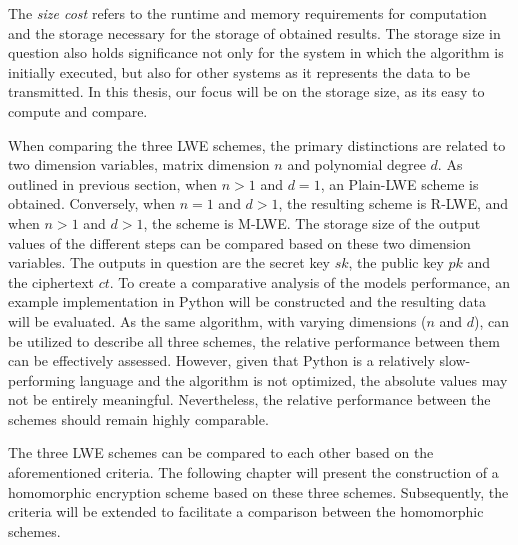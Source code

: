 The \textit{size cost} refers to the runtime and memory requirements for computation and the storage necessary for the storage of obtained results. The storage size in question also holds significance not only for the system in which the algorithm is initially executed, but also for other systems as it represents the data to be transmitted. In this thesis, our focus will be on the storage size, as its easy to compute and compare.

When comparing the three LWE schemes, the primary distinctions are related to two dimension variables, matrix dimension $n$ and polynomial degree $d$. As outlined in previous section, when $n>1$ and $d=1$, an Plain-LWE scheme is obtained. Conversely, when $n=1$ and $d>1$, the resulting scheme is R-LWE, and when $n>1$ and $d>1$, the scheme is M-LWE. The storage size of the output values of the different steps can be compared based on these two dimension variables. The outputs in question are the secret key $sk$, the public key $pk$ and the ciphertext $ct$. To create a comparative analysis of the models performance, an example implementation in Python will be constructed and the resulting data will be evaluated. As the same algorithm, with varying dimensions ($n$ and $d$), can be utilized to describe all three schemes, the relative performance between them can be effectively assessed. However, given that Python is a relatively slow-performing language and the algorithm is not optimized, the absolute values may not be entirely meaningful. Nevertheless, the relative performance between the schemes should remain highly comparable.

The three LWE schemes can be compared to each other based on the aforementioned criteria. The following chapter will present the construction of a homomorphic encryption scheme based on these three schemes. Subsequently, the criteria will be extended to facilitate a comparison between the homomorphic schemes.
